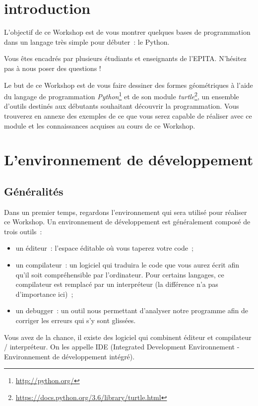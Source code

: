 \documentclass[11pt,a4paper]{article}
\begin{document}

\section{introduction}
L'objectif de ce Workshop est de vous montrer quelques bases de
programmation dans un langage très simple pour débuter~: le Python.

Vous êtes encadrés par plusieurs étudiants et enseignants de l'EPITA. N'hésitez
pas à nous poser des questions !

Le but de ce Workshop est de vous faire dessiner des formes géométriques
à l'aide du langage de programmation
\emph{Python}\footnote{\url{http://python.org/}} et de son module
\emph{turtle}\footnote{\url{https://docs.python.org/3.6/library/turtle.html}},
un ensemble d'outils destinés aux débutants souhaitant découvrir la
programmation.  Vous trouverez en annexe des exemples de ce que vous serez
capable de réaliser avec ce module et les connaissances acquises au cours de ce
Workshop.

\section{L'environnement de développement}
\subsection{Généralités}

Dans un premier temps, regardons l'environnement qui sera utilisé pour réaliser
ce Workshop. Un environnement de développement est généralement composé de trois
outils~:

\begin{itemize}
    \item un éditeur~: l'espace éditable où vous taperez votre code~;
    \item un compilateur~: un logiciel qui traduira le code que vous aurez
        écrit afin qu'il soit compréhensible par l'ordinateur. Pour certains
        langages, ce compilateur est remplacé par un interpréteur (la différence
        n'a pas d'importance ici)~;
    \item un debugger~: un outil nous permettant d'analyser notre programme afin
        de corriger les erreurs qui s'y sont glissées.
\end{itemize}

Vous avez de la chance, il existe des logiciel qui combinent éditeur et
compilateur / interpréteur. On les appelle IDE (Integrated Development
Environnement - Environnement de développement intégré).
\end{document}
